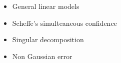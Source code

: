 \documentclass[11pt,fleqn]{book} %
\begin{document}
\begin{itemize}
	\item General linear models
	\item Scheffe's simulteaneous confidence
	\item Singular decomposition
	\item Non Gaussian error
\end{itemize}









\end{document}
